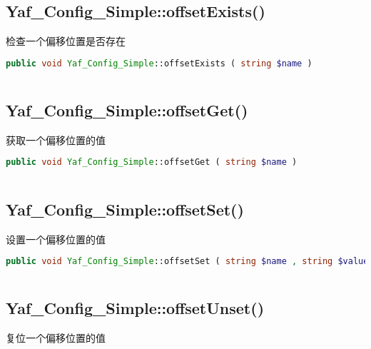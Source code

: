 \subsection{Yaf\_Config\_Simple::offsetExists()}

检查一个偏移位置是否存在

\begin{lstlisting}[language=PHP]
public void Yaf_Config_Simple::offsetExists ( string $name )
\end{lstlisting}

\begin{lstlisting}[language=PHP]

\end{lstlisting}



\subsection{Yaf\_Config\_Simple::offsetGet()}

获取一个偏移位置的值

\begin{lstlisting}[language=PHP]
public void Yaf_Config_Simple::offsetGet ( string $name )
\end{lstlisting}

\begin{lstlisting}[language=PHP]

\end{lstlisting}


\subsection{Yaf\_Config\_Simple::offsetSet()}

设置一个偏移位置的值

\begin{lstlisting}[language=PHP]
public void Yaf_Config_Simple::offsetSet ( string $name , string $value )
\end{lstlisting}

\begin{lstlisting}[language=PHP]

\end{lstlisting}


\subsection{Yaf\_Config\_Simple::offsetUnset()}

复位一个偏移位置的值

